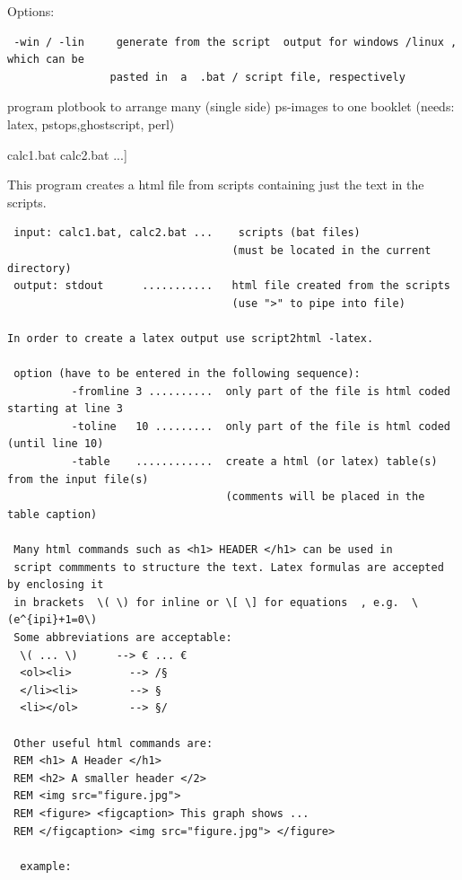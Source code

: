\begin{description}
Options: 
\begin{verbatim}
 -win / -lin     generate from the script  output for windows /linux , which can be
                pasted in  a  .bat / script file, respectively
\end{verbatim}
\item [\prg plotbook *.ps:] program plotbook to arrange many (single side) ps-images to one %
booklet (needs: latex, pstops,ghostscript, perl)
\item [\prg script2html\index{script2html}\label{script2html} [-latex][options]  calc1.bat calc2.bat ...]
This program creates a html file from scripts containing 
just the text
 in the scripts.
\begin{verbatim}
 input: calc1.bat, calc2.bat ...    scripts (bat files)
                                   (must be located in the current directory)
 output: stdout      ...........   html file created from the scripts
                                   (use ">" to pipe into file)

In order to create a latex output use script2html -latex.

 option (have to be entered in the following sequence):
          -fromline 3 ..........  only part of the file is html coded starting at line 3
          -toline   10 .........  only part of the file is html coded (until line 10)
          -table    ............  create a html (or latex) table(s) from the input file(s)
                                  (comments will be placed in the table caption)

 Many html commands such as <h1> HEADER </h1> can be used in
 script commments to structure the text. Latex formulas are accepted by enclosing it 
 in brackets  \( \) for inline or \[ \] for equations  , e.g.  \(e^{ipi}+1=0\) 
 Some abbreviations are acceptable: 
  \( ... \)      --> € ... €
  <ol><li>         --> /§
  </li><li>        --> §
  <li></ol>        --> §/

 Other useful html commands are:
 REM <h1> A Header </h1>
 REM <h2> A smaller header </2>
 REM <img src="figure.jpg">
 REM <figure> <figcaption> This graph shows ... 
 REM </figcaption> <img src="figure.jpg"> </figure>

  example:


\end{verbatim}
\end{description}

